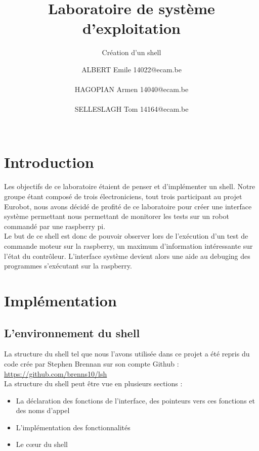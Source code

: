 \documentclass[10pt,a4paper]{article}
\title{Laboratoire de système d'exploitation}
\subtitle{Création d'un shell}
\author{
ALBERT Emile 14022@ecam.be\\\\
HAGOPIAN Armen 14040@ecam.be\\\\
SELLESLAGH Tom 14164@ecam.be\\\\
}
\makeatletter
\def\@subtitle{no title}
\makeatother
\begin{document}
%		

\section{Introduction}
Les objectifs de ce laboratoire étaient de penser et d'implémenter un shell. Notre groupe étant composé de trois électroniciens, tout trois participant au projet Eurobot, nous avons décidé de profité de ce laboratoire pour créer une interface système permettant nous permettant de monitorer les tests sur un robot commandé par une raspberry pi.\\
  
Le but de ce shell est donc de pouvoir observer lors de l'exécution d'un test de commande moteur sur la raspberry, un maximum d'information intéressante sur l'état du contrôleur. L'interface système devient alors une aide au debuging des programmes s'exécutant sur la raspberry.

\section{Implémentation}
\subsection{L'environnement du shell}
La structure du shell tel que nous l'avons utilisée dans ce projet a été repris du code crée par Stephen Brennan sur son compte Github : \url{https://github.com/brenns10/lsh}\\

La structure du shell peut être vue en plusieurs sections :
\begin{itemize}
\item La déclaration des fonctions de l'interface, des pointeurs vers ces fonctions et des noms d'appel
\item L'implémentation des fonctionnalités
\item Le c\oe{}ur du shell 
\end{itemize}
\end{document}
